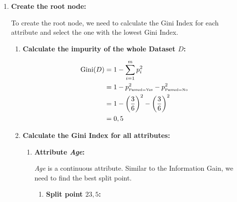 \documentclass[
english,
smallborders
]{i6prcsht}
\newcommand{\OfSpecificValue}[3]{_{\text{\tiny #1#2#3}}}
\begin{document}
\begin{solution}	
	\begin{enumerate}	
		\item \textbf{Create the root node:}
		      
		      To create the root node, we need to calculate the Gini Index for each attribute and select the one with the lowest Gini Index.
		      
		      \begin{enumerate}	
			      \item \textbf{Calculate the impurity of the whole Dataset $D$:}
			            
			            \begin{alignat*}{2}
				            \text{Gini}(D) & = 1 - \sum_{i=1}^{m}p_i^2                                                      \\
				                           & = 1 - p\OfSpecificValue{Passed}{=}{Yes}^2 - p\OfSpecificValue{Passed}{=}{No}^2 \\
				                           & = 1 - \left(\frac{3}{6}\right)^2 - \left(\frac{3}{6}\right)^2                  \\
				                           & = 0,5                                                                          \\
			            \end{alignat*}
			            
			      \item \textbf{Calculate the Gini Index for all attributes:}
			            
			            \begin{enumerate}	
				            \item \textbf{Attribute \textit{Age}:}
				                  
				                  \textit{Age} is a continuous attribute. Similar to the Information Gain, we need to find the best split point.
				                  
				                  \begin{enumerate}	
					                  \item \textbf{Split point $23,5$:}
					                        

\end{enumerate}
\end{enumerate}
\end{enumerate}
\end{enumerate}
\end{solution}
\end{document}

